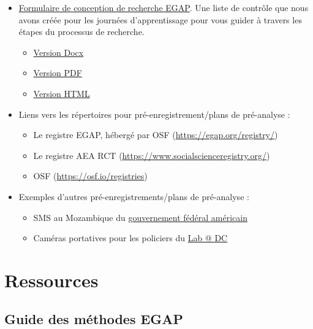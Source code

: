 \documentclass[
  12pt,
]{book}
\begin{document}
\begin{itemize}
\item
  \href{https://egap.github.io/learningdays-resources/Exercises/design-form.html}{Formulaire de conception de recherche EGAP}. Une liste de contrôle que nous avons créée pour les journées d'apprentissage pour vous guider à travers les étapes du processus de recherche.

  \begin{itemize}
  \item
    \href{https://egap.github.io/learningdays-resources/Exercises/design-form.docx}{Version Docx}
  \item
    \href{https://egap.github.io/learningdays-resources/Exercises/design-form.pdf}{Version PDF}
  \item
    \href{https://egap.github.io/learningdays-resources/Exercises/design-form.html}{Version HTML}
  \end{itemize}
\item
  Liens vers les répertoires pour pré-enregistrement/plans de pré-analyse :

  \begin{itemize}
  \item
    Le registre EGAP, hébergé par OSF (\url{https://egap.org/registry/})
  \item
    Le registre AEA RCT (\url{https://www.socialscienceregistry.org/})
  \item
    OSF (\url{https://osf.io/registries})
  \end{itemize}
\item
  Exemples d'autres pré-enregistrements/plans de pré-analyse :

  \begin{itemize}
  \item
    SMS au Mozambique du \href{https://oes.gsa.gov/projects/sms-mozambique/}{gouvernement fédéral américain}
  \item
    Caméras portatives pour les policiers du \href{https://osf.io/472zh}{Lab @ DC}
  \end{itemize}
\end{itemize}

\hypertarget{ressources}{%
\section{Ressources}\label{ressources}}

\hypertarget{guide-des-muxe9thodes-egap}{%
\subsection{Guide des méthodes EGAP}\label{guide-des-muxe9thodes-egap}}
\end{document}
